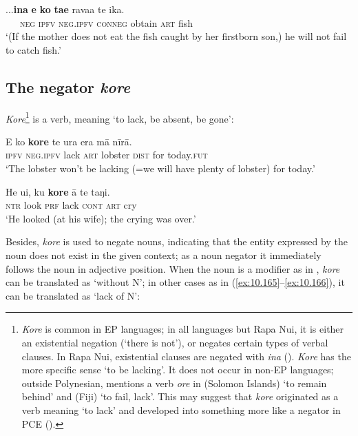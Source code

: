 \ea\label{ex:10.161}
\gll ...\textbf{{\ꞌ}ina} \textbf{e} \textbf{ko} \textbf{ta{\ꞌ}e} rava{\ꞌ}a te ika.\\
~~~\textsc{neg} \textsc{ipfv} \textsc{neg.ipfv} \textsc{conneg} obtain \textsc{art} fish\\

\glt 
‘(If the mother does not eat the fish caught by her firstborn son,) he will not fail to catch fish.’ \textstyleExampleref{[Ley-5-27.008]}
\z
{}
\subsection{The negator \textit{kore}}\label{sec:10.5.7}
\textit{Kore}\footnote{\label{fn:502}\textit{Kore} is common in EP languages; in all languages but Rapa Nui, it is either an existential negation (‘there is not’), or negates certain types of verbal clauses. In Rapa Nui, existential clauses are negated with \textit{{\ꞌ}ina} (). \textit{Kore} has the more specific sense ‘to be lacking’. It does not occur in non-EP languages; outside Polynesian, \citet[98]{Clark1976} mentions a verb \textit{ore} in  (Solomon Islands) ‘to remain behind’ and  (Fiji) ‘to fail, lack’. This may suggest that \textit{kore} originated as a verb meaning ‘to lack’ and developed into something more like a negator in PCE (\citealt[101–102]{Clark1976}).} is a verb, meaning ‘to lack, be absent, be gone’:

\ea\label{ex:10.162}
\gll E ko \textbf{kore} te {\ꞌ}ura era mā nīrā. \\
\textsc{ipfv} \textsc{neg.ipfv} lack \textsc{art} lobster \textsc{dist} for today.\textsc{fut} \\

\glt 
‘The lobster won’t be lacking (=we will have plenty of lobster) for today.’ \textstyleExampleref{[R230.033]} 
\z

\ea\label{ex:10.163}
\gll He u{\ꞌ}i, ku \textbf{kore} {\ꞌ}ā te taŋi. \\
\textsc{ntr} look \textsc{prf} lack \textsc{cont} \textsc{art} cry \\

\glt 
‘He looked (at his wife); the crying was over.’ \textstyleExampleref{[Ley-9-55.076]}
\z

Besides, \textit{kore} is used to negate nouns, indicating that the entity expressed by the noun does not exist in the given context; as a noun negator it immediately follows the noun in adjective position. When the noun is a modifier as in , \textit{kore} can be translated as ‘without N’; in other cases as in (\ref{ex:10.165}–\ref{ex:10.166}), it can be translated as ‘lack of N’:

